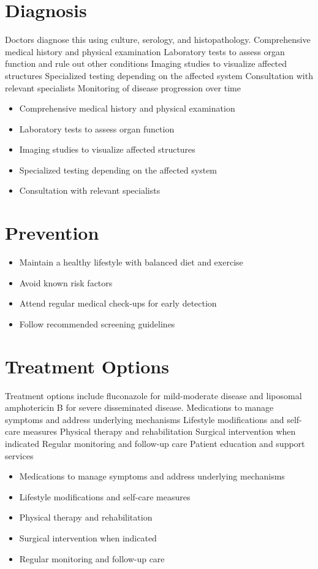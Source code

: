 \section{Diagnosis}
Doctors diagnose this using culture, serology, and histopathology. Comprehensive medical history and physical examination Laboratory tests to assess organ function and rule out other conditions Imaging studies to visualize affected structures Specialized testing depending on the affected system Consultation with relevant specialists Monitoring of disease progression over time

\begin{itemize}[noitemsep]
  \item Comprehensive medical history and physical examination
  \item Laboratory tests to assess organ function
  \item Imaging studies to visualize affected structures
  \item Specialized testing depending on the affected system
  \item Consultation with relevant specialists
\end{itemize}
\section{Prevention}
\begin{itemize}[noitemsep]
  \item Maintain a healthy lifestyle with balanced diet and exercise
  \item Avoid known risk factors
  \item Attend regular medical check-ups for early detection
  \item Follow recommended screening guidelines
\end{itemize}
\section{Treatment Options}
Treatment options include fluconazole for mild-moderate disease and liposomal amphotericin B for severe disseminated disease. Medications to manage symptoms and address underlying mechanisms Lifestyle modifications and self-care measures Physical therapy and rehabilitation Surgical intervention when indicated Regular monitoring and follow-up care Patient education and support services

\begin{itemize}[noitemsep]
  \item Medications to manage symptoms and address underlying mechanisms
  \item Lifestyle modifications and self-care measures
  \item Physical therapy and rehabilitation
  \item Surgical intervention when indicated
  \item Regular monitoring and follow-up care
\end{itemize}
